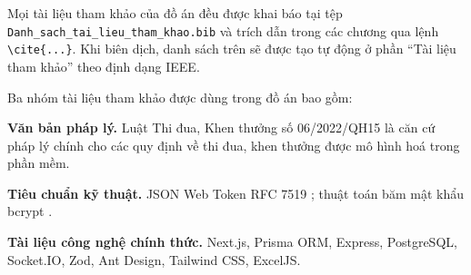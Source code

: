 \documentclass[../DoAn.tex]{subfiles}
\begin{document}
Mọi tài liệu tham khảo của đồ án đều được khai báo tại tệp \texttt{Danh\_sach\_tai\_lieu\_tham\_khao.bib} và trích dẫn trong các chương qua lệnh \texttt{\textbackslash cite\{...\}}.
Khi biên dịch, danh sách trên sẽ được tạo tự động ở phần ``Tài liệu tham khảo'' theo định dạng IEEE.

Ba nhóm tài liệu tham khảo được dùng trong đồ án bao gồm:

\textbf{Văn bản pháp lý.} Luật Thi đua, Khen thưởng số 06/2022/QH15 \cite{luat062022} là căn cứ pháp lý chính cho các quy định về thi đua, khen thưởng được mô hình hoá trong phần mềm.

\textbf{Tiêu chuẩn kỹ thuật.} JSON Web Token RFC 7519 \cite{rfc7519}; thuật toán băm mật khẩu bcrypt \cite{bcrypt}.

\textbf{Tài liệu công nghệ chính thức.} Next.js, Prisma ORM, Express, PostgreSQL, Socket.IO, Zod, Ant Design, Tailwind CSS, ExcelJS.
\end{document}
